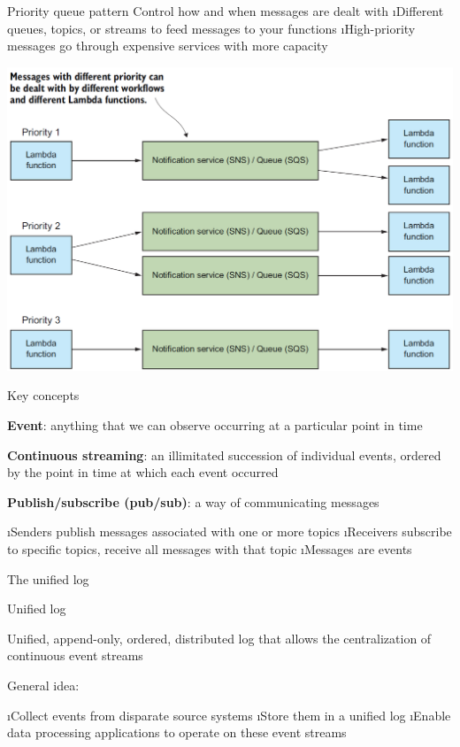 \begin{frame}{Priority queue pattern}
Control how and when messages are dealt with
\i Different queues, topics, or streams to feed messages to your functions 
\i High-priority messages go through expensive services with more capacity

\includegraphics[scale=.4]{imgs/pattern_priority.PNG}
\end{frame}

\begin{frame}{Key concepts}

\textbf{Event}: anything that we can observe occurring at a particular point in time

\textbf{Continuous streaming}: an illimitated succession of individual events, ordered by the point in time at which each event occurred

\textbf{Publish/subscribe (pub/sub)}: a way of communicating messages

\i Senders publish messages associated with one or more topics
\i Receivers subscribe to specific topics, receive all messages with that topic
\i Messages are events

\end{frame}

\begin{frame}{The unified log}

\begin{block}{Unified log}

Unified, append-only, ordered, distributed log that allows the centralization of continuous event streams

\end{block}

General idea:

\i Collect events from disparate source systems
\i Store them in a unified log
\i Enable data processing applications to operate on these event streams

\end{frame}

